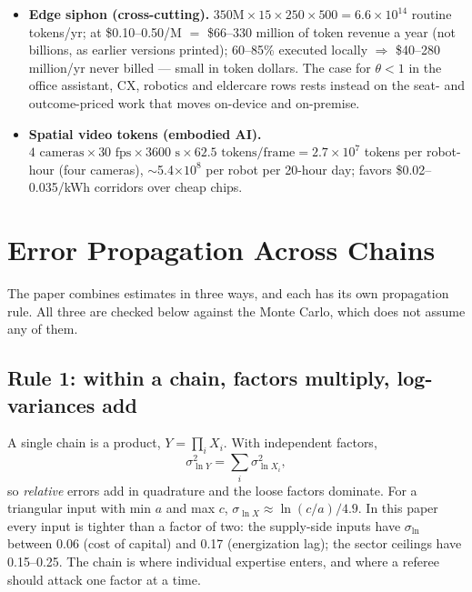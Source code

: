 \documentclass[11pt,letterpaper]{article}
\begin{document}
\begin{itemize}
    \item \textbf{Edge siphon (cross-cutting).} $350\text{M}\times15\times250\times500=6.6\times10^{14}$ routine tokens/yr; at \$0.10--0.50/M $=$ \$66--330 million of token revenue a year (not billions, as earlier versions printed); 60--85\% executed locally $\Rightarrow$ \$40--280 million/yr never billed --- small in token dollars. The case for $\theta<1$ in the office assistant, CX, robotics and eldercare rows rests instead on the seat- and outcome-priced work that moves on-device and on-premise.
    \item \textbf{Spatial video tokens (embodied AI).} $4\text{ cameras}\times30\text{ fps}\times3600\text{ s}\times62.5\text{ tokens/frame}=2.7\times10^{7}$ tokens per robot-hour (four cameras), $\sim$5.4$\times10^{8}$ per robot per 20-hour day; favors \$0.02--0.035/kWh corridors over cheap chips.
\end{itemize}


\section{Error Propagation Across Chains}\label{app:errors}
The paper combines estimates in three ways, and each has its own propagation rule. All three are checked below against the Monte Carlo, which does not assume any of them.

\subsection{Rule 1: within a chain, factors multiply, log-variances add}
A single chain is a product, $Y=\prod_i X_i$. With independent factors,
\begin{equation}
\sigma^{2}_{\ln Y}=\sum_i\sigma^{2}_{\ln X_i},
\end{equation}
so \emph{relative} errors add in quadrature and the loose factors dominate. For a triangular input with min $a$ and max $c$, $\sigma_{\ln X}\approx\ln(c/a)/4.9$. In this paper every input is tighter than a factor of two: the supply-side inputs have $\sigma_{\ln}$ between 0.06 (cost of capital) and 0.17 (energization lag); the sector ceilings have 0.15--0.25. The chain is where individual expertise enters, and where a referee should attack one factor at a time.
\end{document}
